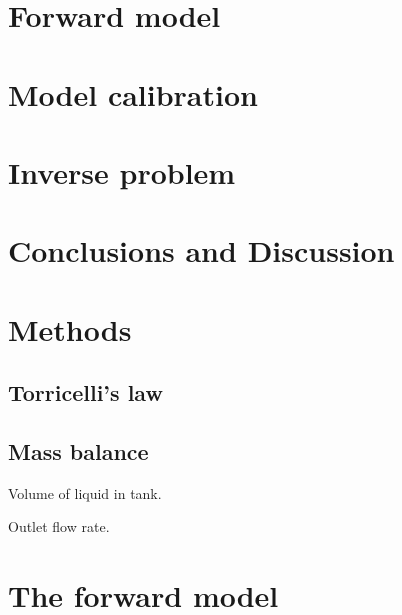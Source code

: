 \documentclass[openacc]{rsproca_new}%
\begin{document}
\section{Forward model}

\section{Model calibration}

\section{Inverse problem}

\section{Conclusions and Discussion}

\section{Methods}

\subsection{Torricelli's law}

\subsection{Mass balance}
Volume of liquid in tank. 

Outlet flow rate.



\section{The forward model}
\end{document}
